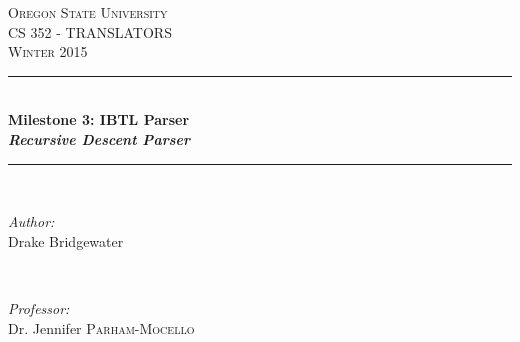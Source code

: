 \documentclass[letterpaper,10pt]{article}
\def\name{Drake Bridgewater }
\def\title{Milestone 3: IBTL Parser }
\def\subtitle{Recursive Descent Parser}
\def\subject{CS }
\def\courseNumber{352 }
\def\courseName{TRANSLATORS }
\def\courseInfo{Winter 2015 }%
\def\supervisor{Dr. Jennifer \textsc{Parham-Mocello }} %
\begin{document}
\begin{titlepage}

\newcommand{\HRule}{\rule{\linewidth}{0.5mm}} %

\center %
 

\textsc{\LARGE Oregon State University}\\[1.5cm] %
\textsc{\Large \subject \courseNumber - \courseName}\\[0.5cm] %
\textsc{\large \courseInfo}\\[1.5cm] %


\HRule \\[0.4cm]
{ \huge \bfseries \title }\\[0.1cm] %
{\small \textit{\textbf{ \subtitle }}}\\[0.2cm]
\HRule \\[7.5cm]
 

\begin{minipage}{0.4\textwidth}
\begin{flushleft} \large
\emph{Author:}\\
\name
\end{flushleft}
\end{minipage}
~
\begin{minipage}{0.4\textwidth}
\begin{flushright} \large
\emph{Professor:} \\
\supervisor
\end{flushright}
\end{minipage}\\[4cm]



\end{titlepage}
\end{document}
